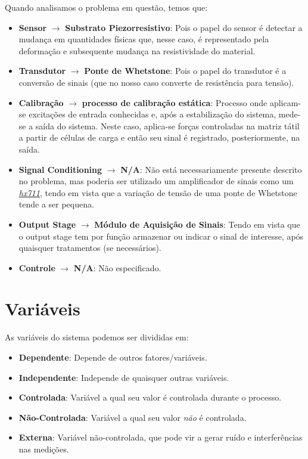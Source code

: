 \documentclass{article}
\begin{document}
        Quando analisamos o problema em questão, temos que:
        \begin{itemize}
            \item \textbf{Sensor} $\rightarrow$ \textbf{Substrato Piezorresistivo}: Pois o papel do sensor é detectar a mudança em quantidades físicas que, nesse caso, é representado pela deformação e subsequente mudança na resistividade do material.
            
            \item \textbf{Transdutor} $\rightarrow$ \textbf{Ponte de Whetstone}: Pois o papel do transdutor é a conversão de sinais (que no nosso caso converte de resistência para tensão).

            \item \textbf{Calibração} $\rightarrow$ \textbf{processo de calibração estática}: Processo onde aplicam-se excitações de entrada conhecidas e, após a estabilização do sistema, mede-se a saída do sistema. Neste caso, aplica-se forças controladas na matriz tátil a partir de células de carga e então seu sinal é registrado, posteriormente, na saída.
            
            \item \textbf{Signal Conditioning} $\rightarrow$ \textbf{N/A}: Não está necessariamente presente descrito no problema, mas poderia ser utilizado um amplificador de sinais como um \href{https://pdf1.alldatasheet.com/datasheet-pdf/view/1371088/SPARKFUN/HX711.html}{\emph{hx711}}, tendo em vista que a variação de tensão de uma ponte de Whetstone tende a ser pequena.

            \item \textbf{Output Stage} $\rightarrow$ \textbf{Módulo de Aquisição de Sinais}: Tendo em vista que o output stage tem por função armazenar ou indicar o sinal de interesse, após quaisquer tratamentos (se necessários).

            \item \textbf{Controle} $\rightarrow$ \textbf{N/A}: Não especificado.
            
        \end{itemize}

\newpage
\section*{Variáveis}

    As variáveis do sistema podemos ser divididas em: 
    \begin{itemize}
        \item \textbf{Dependente}: Depende de outros fatores/variáveis.
        \item \textbf{Independente}: Independe de quaisquer outras variáveis.
        \item \textbf{Controlada}: Variável a qual seu valor é controlada durante o processo.
        \item \textbf{Não-Controlada}: Variável a qual seu valor \emph{não} é controlada.
        \item \textbf{Externa}: Variável não-controlada, que pode vir a gerar ruído e interferências nas medições.
    \end{itemize}
\end{document}
